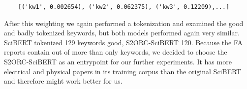 \begin{code}
	\label{code:wheights}
	\centering
\begin{verbatim}
	[('kw1', 0.002654), ('kw2', 0.062375), ('kw3', 0.12209),...]
\end{verbatim}
\end{code}

After this weighting we again performed a tokenization and examined the good and badly tokenized keywords, but both models performed again very similar. SciBERT tokenized 129 keywords good, S2ORC-SciBERT 120. Because the FA reports contain out of more than only keywords, we decided to choose the S2ORC-SciBERT as an entrypoint for our further experiments. It has more electrical and physical papers in its training corpus than the original SciBERT and therefore might work better for us.